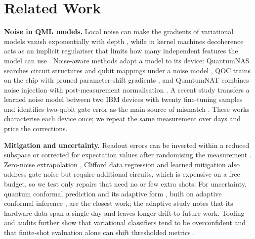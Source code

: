 \section{Related Work}
\label{sec:related}

\textbf{Noise in QML models.} Local noise can make the gradients of variational models vanish
exponentially with depth \cite{wang2021nibp}, while in kernel machines decoherence acts as an
implicit regulariser that limits how many independent features the model can use
\cite{heyraud2022noisykernels}. Noise-aware methods adapt a model to its device: QuantumNAS
searches circuit structures and qubit mappings under a noise model \cite{wang2022quantumnas},
QOC trains on the chip with pruned parameter-shift gradients \cite{wang2022qoc}, and QuantumNAT
combines noise injection with post-measurement normalisation \cite{wang2022quantumnat}. A recent
study transfers a learned noise model between two IBM devices with twenty fine-tuning samples
and identifies two-qubit gate error as the main source of mismatch \cite{farib2026crossdevice}.
These works characterise each device once; we repeat the same measurement over days and price
the corrections.

\textbf{Mitigation and uncertainty.} Readout errors can be inverted within a reduced subspace
\cite{nation2021m3} or corrected for expectation values after randomising the measurement
\cite{vandenberg2022trex}. Zero-noise extrapolation \cite{temme2017zne}, Clifford data
regression \cite{czarnik2021cdr} and learned mitigation \cite{liao2024mlqem} also address gate
noise but require additional circuits, which is expensive on a free budget, so we test only
repairs that need no or few extra shots. For uncertainty, quantum conformal prediction
\cite{park2023qcp} and its adaptive form \cite{spencer2026aqcp}, built on adaptive conformal
inference \cite{gibbs2021aci}, are the closest work; the adaptive study notes that its hardware
data span a single day and leaves longer drift to future work. Tooling and audits further show
that variational classifiers tend to be overconfident \cite{quantumuq2026} and that finite-shot
evaluation alone can shift thresholded metrics \cite{fernandezbarrios2026conditional}.

